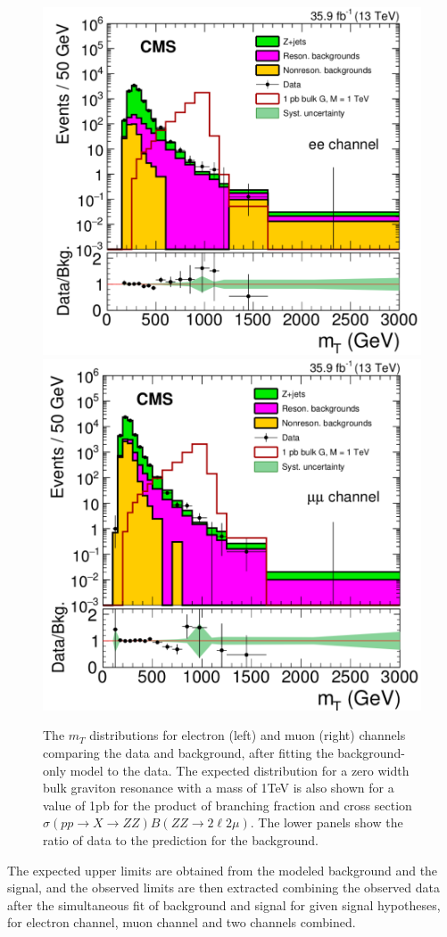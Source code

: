 \begin{figure}[htbp]
\begin{center}
\includegraphics[width=0.49\linewidth]{figures/sys_elSRuncMT.png}
\includegraphics[width=0.49\linewidth]{figures/sys_muSRuncMT.png}
\caption{The $m_T$ distributions for electron (left) and muon (right) channels comparing the data and background, after fitting the background-only model to the data. The expected distribution for a zero width bulk graviton resonance with a mass of 1TeV is also shown for a value of 1pb for the product of branching fraction and cross section $\sigma(pp\rightarrow X\rightarrow ZZ)B(ZZ\rightarrow 2\ell 2\mu)$. The lower panels show the ratio of data to the prediction for the background.}
\label{fig:sys_uncMT}
\end{center}
\end{figure}

\vspace{0.3cm}
The expected upper limits are obtained from the modeled background and the signal, and the observed limits are then extracted combining the observed data after the simultaneous fit of background and signal for given signal hypotheses, for electron channel, muon channel and two channels combined. 


